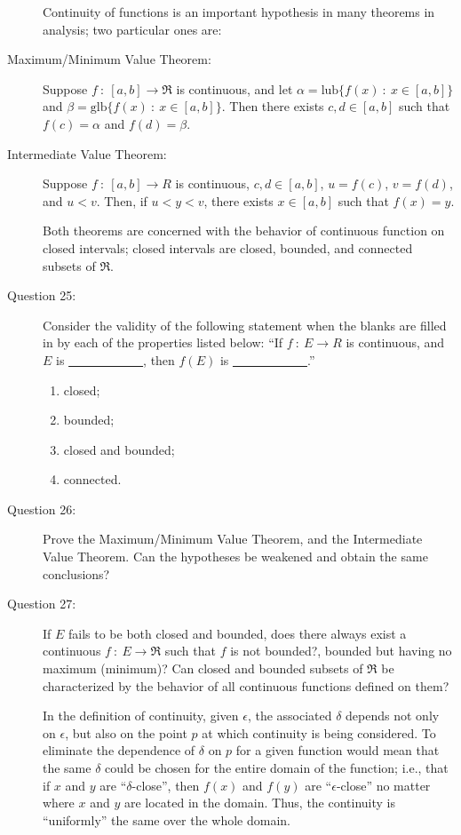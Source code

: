\documentclass{article}
\begin{document}
\begin{description}
  \item[] Continuity of functions is an important hypothesis in many theorems in analysis; two particular ones are:

  \item[Maximum/Minimum Value Theorem:] Suppose $f\ :\ [a,b] \to \Re$ is continuous, and let $\alpha = \text{lub} \{ f(x)\ :\ x \in [a,b] \}$ and $\beta = \text{glb} \{ f(x)\ :\ x \in [a,b] \}$. Then there exists $c,d \in [a,b]$ such that $f(c) = \alpha$ and $f(d) = \beta$.

  \item[Intermediate Value Theorem:] Suppose $f\ :\ [a,b] \to R$ is continuous, $c,d \in [a,b]$, $u = f(c)$, $v = f(d)$, and $u < v$. Then, if $u < y < v$, there exists $x \in [a,b]$ such that $f(x) = y$.

  \item[] Both theorems are concerned with the behavior of continuous function on closed intervals; closed intervals are closed, bounded, and connected subsets of $\Re$.

  \item[Question 25:] Consider the validity of the following statement when the blanks are filled in by each of the properties listed below: ``If $f\ :\ E \to R$ is continuous, and $E$ is \underline{\ \ \ \ \ \ \ \ \ \ \ \ }, then $f(E)$ is \underline{\ \ \ \ \ \ \ \ \ \ \ \ }.''
    \begin{enumerate}[\hspace{1cm}(1)]
      \item closed;
      \item bounded;
      \item closed and bounded;
      \item connected.
    \end{enumerate}

  \item[Question 26:] Prove the Maximum/Minimum Value Theorem, and the Intermediate Value Theorem. Can the hypotheses be weakened and obtain the same conclusions?

  \item[Question 27:] If $E$ fails to be both closed and bounded, does there always exist a continuous $f\ :\ E \to \Re$ such that $f$ is not bounded?, bounded but having no maximum (minimum)? Can closed and bounded subsets of $\Re$ be characterized by the behavior of all continuous functions defined on them?

  \item[] In the definition of continuity, given $\epsilon$, the associated $\delta$ depends not only on $\epsilon$, but also on the point $p$ at which continuity is being considered. To eliminate the dependence of $\delta$ on $p$ for a given function would mean that the same $\delta$ could be chosen for the entire domain of the function; i.e., that if $x$ and $y$ are ``$\delta$-close'', then $f(x)$ and $f(y)$ are ``$\epsilon$-close'' no matter where $x$ and $y$ are located in the domain. Thus, the continuity is ``uniformly'' the same over the whole domain.


\end{description}
\end{document}
